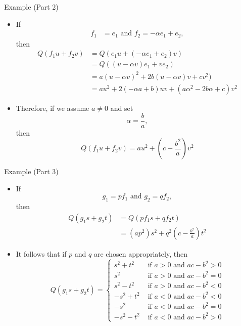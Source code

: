 \documentclass[usenames,dvipsnames,10pt]{beamer}
\begin{document}
\begin{frame}
  {Example (Part 2)}

  \begin{itemize}
  \item If
    \begin{align*}
      f_1 &= e_1\text{ and }f_2 = -\alpha e_1+ e_2,
    \end{align*}
    then
    \begin{align*}
      Q(f_1u+f_2v) &= Q(e_1u + (-\alpha e_1+e_2)v)\\
                   &= Q((u-\alpha v)e_1+ ve_2)\\
                   &= a(u-\alpha v)^2 + 2b(u-\alpha v)v + cv^2)\\
                   &= au^2 + 2(-\alpha a + b)uv + (a\alpha^2 -2b \alpha + c)v^2
    \end{align*}
  \item Therefore, if we assume $a \ne 0$ and set
    \[
      \alpha =  \frac{b}{a},
    \]
    then
    \[
      Q(f_1u+f_2v) = au^2 + \left(c-\frac{b^2}{a}\right)v^2
    \]
  \end{itemize}
\end{frame}

\begin{frame}
  {Example (Part 3)}

  \begin{itemize}
  \item If
    \[ g_1 = pf_1\text{ and }g_2 = qf_2, \]
    then
    \begin{align*}
      Q(g_1 s + g_2t) &= Q(pf_1 s + qf_2t)\\
                      &= (ap^2)s^2 + q^2\left(c-\frac{b^2}{a}\right)t^2
    \end{align*}
  \item It follows that if $p$ and $q$ are chosen appropriately,  then
    \[
      Q(g_1s+g_2t) =
      \begin{cases}
        s^2 + t^2 &\text{ if }a > 0\text{ and }ac - b^2 > 0\\
        s^2 &\text{ if }a > 0\text{ and }ac-b^2=0\\
        s^2 - t^2 &\text{ if }a > 0\text{ and }ac - b^2 < 0\\
        -s^2 + t^2 &\text{ if }a < 0\text{ and }ac - b^2 < 0\\
        -s^2 &\text{ if }a < 0\text{ and }ac - b^2 = 0\\
        -s^2 - t^2 &\text{ if }a < 0\text{ and }ac - b^2 > 0
      \end{cases}
    \]
  \end{itemize}
\end{frame}
\end{document}
